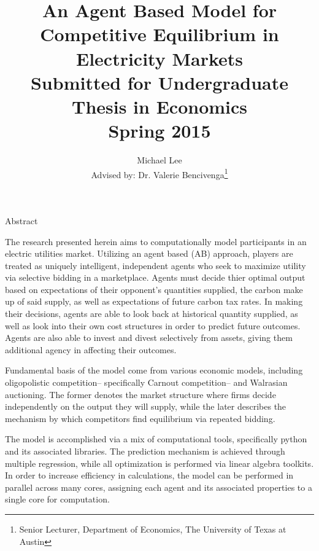 \documentclass[12pt]{article}
\begin{document}
\title{An Agent Based Model for Competitive Equilibrium in Electricity Markets\\ \small{Submitted for Undergraduate Thesis in Economics\\ Spring 2015}}


\author{Michael Lee \\{\small Advised by: Dr. Valerie Bencivenga\thanks{ Senior Lecturer, Department of Economics, The University of Texas at Austin}}}


\maketitle{}
\thispagestyle{empty}
\newpage{}


\begin{center}Abstract\end{center}

The research presented herein aims to computationally model participants in an electric utilities market. Utilizing an agent based (AB) approach, players are treated as uniquely intelligent, independent agents who seek to maximize utility via selective bidding in a marketplace. Agents must decide thier optimal output based on expectations of their opponent's quantities supplied, the carbon make up of said supply, as well as expectations of future carbon tax rates. In making their decisions, agents are able to look back at historical quantity supplied, as well as look into their own cost structures in order to predict future outcomes. Agents are also able to invest and divest selectively from assets, giving them additional agency in affecting their outcomes. \*

Fundamental basis of the model come from various economic models, including oligopolistic competition-- specifically Carnout competition-- and Walrasian auctioning. The former denotes the market structure where firms decide independently on the output they will supply, while the later describes the mechanism by which competitors find equilibrium via repeated bidding. \*


The model is accomplished via a mix of computational tools, specifically python and its associated libraries. The prediction mechanism is achieved through multiple regression, while all optimization is performed via linear algebra toolkits. In order to increase efficiency in calculations, the model can be performed in parallel across many cores, assigning each agent and its associated properties to a single core for computation. 
\end{document}

